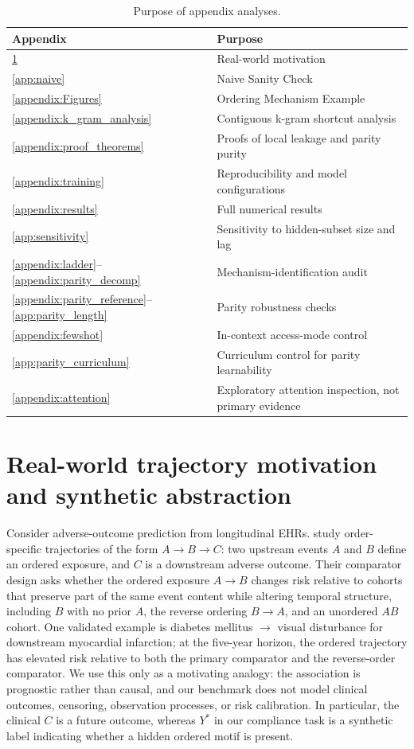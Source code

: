 \documentclass{article}
\theoremstyle{plain}
\theoremstyle{definition}
\theoremstyle{remark}
\begin{document}
\begin{table}[h]
\centering
\caption{Purpose of appendix analyses.}
\begin{tabular}{ll}
\toprule
Appendix & Purpose \\
\midrule
\ref{app:illustrative} & Real-world motivation \\
\ref{app:naive} & Naive Sanity Check \\
\ref{appendix:Figures} & Ordering Mechanism Example \\
\ref{appendix:k_gram_analysis} & Contiguous k-gram shortcut analysis \\
\ref{appendix:proof_theorems} & Proofs of local leakage and parity purity \\
\ref{appendix:training} & Reproducibility and model configurations \\
\ref{appendix:results} & Full numerical results \\
\ref{app:sensitivity} & Sensitivity to hidden-subset size and lag \\
\ref{appendix:ladder}--\ref{appendix:parity_decomp} & Mechanism-identification audit \\
\ref{appendix:parity_reference}--\ref{app:parity_length} & Parity robustness checks \\
\ref{appendix:fewshot} & In-context access-mode control \\
\ref{app:parity_curriculum} & Curriculum control for parity learnability \\
\ref{appendix:attention} & Exploratory attention inspection, not primary evidence \\
\bottomrule
\end{tabular}
\end{table}

\section{Real-world trajectory motivation and synthetic abstraction}
\label{app:illustrative}

Consider adverse-outcome prediction from longitudinal EHRs. 
\citet{edelman2026order_specific_ehr} study order-specific trajectories of the form \(A\to B\to C\): two upstream events \(A\) and \(B\) define an ordered exposure, and \(C\) is a downstream adverse outcome. Their comparator design asks whether the ordered exposure \(A\to B\) changes risk relative to cohorts that preserve part of the same event content while altering temporal structure, including \(B\) with no prior \(A\), the reverse ordering \(B\to A\), and an unordered \(AB\) cohort. One validated example is diabetes mellitus \(\to\) visual disturbance for downstream myocardial infarction; at the five-year horizon, the ordered trajectory has elevated risk relative to both the primary comparator and the reverse-order comparator. We use this only as a motivating analogy: the association is prognostic rather than causal, and our benchmark does not model clinical outcomes, censoring, observation processes, or risk calibration. In particular, the clinical \(C\) is a future outcome, whereas \(Y^*\) in our compliance task is a synthetic label indicating whether a hidden ordered motif is present.
\end{document}
